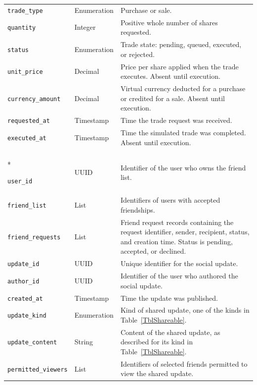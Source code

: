 \documentclass[12pt]{article}
\begin{document}
\begin{longtable}{
    @{}p{}
    p{}
    p{}@{}
}
\texttt{trade\_type} & Enumeration &
Purchase or sale.\\

\texttt{quantity} & Integer &
Positive whole number of shares requested.\\

\texttt{status} & Enumeration &
Trade state: pending, queued, executed, or rejected.\\

\texttt{unit\_price} & Decimal &
Price per share applied when the trade executes.
Absent until execution.\\

\texttt{currency\_amount} & Decimal &
Virtual currency deducted for a purchase or credited for a sale.
Absent until execution.\\

\texttt{requested\_at} & Timestamp &
Time the trade request was received.\\

\texttt{executed\_at} & Timestamp &
Time the simulated trade was completed.
Absent until execution.\\

\addlinespace


\multicolumn{3}{@{}l}{\textbf{Social Data --- Phone and server}}\\*
\midrule

\texttt{user\_id} & UUID &
Identifier of the user who owns the friend list.\\

\texttt{friend\_list} & List &
Identifiers of users with accepted friendships.\\

\texttt{friend\_requests} & List &
Friend request records containing the request identifier,
sender, recipient, status, and creation time.
Status is pending, accepted, or declined.\\

\texttt{update\_id} & UUID &
Unique identifier for the social update.\\

\texttt{author\_id} & UUID &
Identifier of the user who authored the social update.\\

\texttt{created\_at} & Timestamp &
Time the update was published.\\

\texttt{update\_kind} & Enumeration &
Kind of shared update, one of the kinds in Table~\ref{TblShareable}.\\

\texttt{update\_content} & String &
Content of the shared update, as described for its kind in
Table~\ref{TblShareable}.\\

\texttt{permitted\_viewers} & List &
Identifiers of selected friends permitted to view the
shared update.\\

\bottomrule
\end{longtable}
\end{document}
